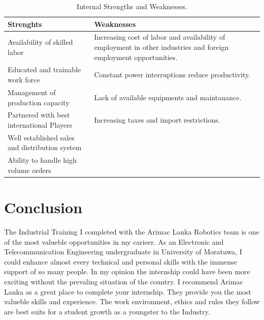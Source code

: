 \documentclass[twoside,12pt,times,onecolumn,a4paper]{report}
\begin{document}
\begin{table}[!h]
\centering
 \begin{tabular}{||p{}|p{}||}
 \hline
 Strenghts &  Weaknesses \\ [0.5ex] 
 \hline\hline
 Availability of skilled labor & Increasing cost of labor and availability of employment in other industries and foreign employment opportunities. \\ 
 \hline
 Educated and trainable work force & Constant power interruptions reduce productivity.  \\
 \hline
Management of production capacity  & Lack of available equipments and maintanance.  \\  
 \hline
Partnered with best international Players & Increasing taxes and import restrictions.\\
 \hline
Well established sales and distribution system &   \\
 \hline
Ability to handle high volume orders &   \\ [1ex]
\hline
 \end{tabular}
\caption{Internal Strengths and Weaknesses.}
\label{tab:table1}
\end{table}


\chapter{Conclusion}
\hspace{3em} The Industrial Training I completed with the Arimac Lanka Robotics team is one of the most valueble opportunities in my carieer. As an Electronic and Telecommunication Engineering undergraduate in University of Moratuwa, I could enhance almost every technical and personal skills with the immense support of so many people. In my opinion the internship could have been more exciting without the prevaling situation of the country. I recommend Arimac Lanka as a great place to complete your internship. They provide you the most valueble skills and experience. The work environment, ethics and rules they follow are best suits for a student growth as a youngster to the Industry. 
\\\\\\\\\\\\\\\\\\\\\\\\
\end{document}
